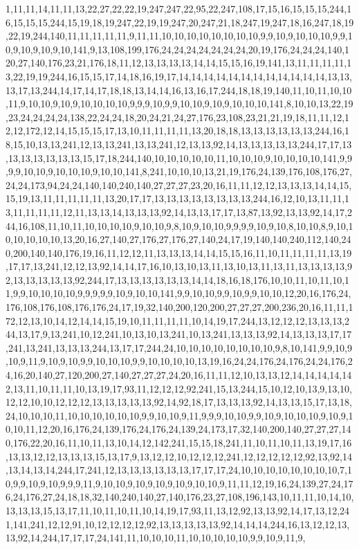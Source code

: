 1,11,11,14,11,11,13,22,27,22,22,19,247,247,22,95,22,247,108,17,15,16,15,15,15,244,16,15,15,15,244,15,19,18,19,247,22,19,19,247,20,247,21,18,247,19,247,18,16,247,18,19,22,19,244,140,11,11,11,11,11,9,11,11,10,10,10,10,10,10,10,10,9,9,10,9,10,10,10,9,9,10,9,10,9,10,9,10,141,9,13,108,199,176,24,24,24,24,24,24,24,20,19,176,24,24,24,140,120,27,140,176,23,21,176,18,11,12,13,13,13,13,14,14,15,15,16,19,141,13,11,11,11,11,13,22,19,19,244,16,15,15,17,14,18,16,19,17,14,14,14,14,14,14,14,14,14,14,14,14,13,13,13,17,13,244,14,17,14,17,18,18,13,14,14,16,13,16,17,244,18,18,19,140,11,10,11,10,10,11,9,10,10,9,10,9,10,10,10,10,9,9,9,10,9,9,10,10,9,10,9,10,10,10,141,8,10,10,13,22,19,23,24,24,24,24,138,22,24,24,18,20,24,21,24,27,176,23,108,23,21,21,19,18,11,11,12,12,12,172,12,14,15,15,15,17,13,10,11,11,11,11,13,20,18,18,13,13,13,13,13,13,244,16,18,15,10,13,13,241,12,13,13,241,13,13,241,12,13,13,92,14,13,13,13,13,13,244,17,17,13,13,13,13,13,13,13,15,17,18,244,140,10,10,10,10,10,11,10,10,10,9,10,10,10,10,141,9,9,9,9,10,10,9,10,10,10,9,10,10,141,8,241,10,10,10,13,21,19,176,24,139,176,108,176,27,24,24,173,94,24,24,140,140,240,140,27,27,27,23,20,16,11,11,12,12,13,13,13,14,14,15,15,19,13,11,11,11,11,11,13,20,17,17,13,13,13,13,13,13,13,13,244,16,12,10,13,11,11,13,11,11,11,11,12,11,13,13,14,13,13,13,92,14,13,13,17,17,13,87,13,92,13,13,92,14,17,244,16,108,11,10,11,10,10,10,10,9,10,10,9,8,10,9,10,10,9,9,9,9,10,9,10,8,10,10,8,9,10,10,10,10,10,10,13,20,16,27,140,27,176,27,176,27,140,24,17,19,140,140,240,112,140,240,200,140,140,176,19,16,11,12,12,11,13,13,13,14,14,15,15,16,11,10,11,11,11,11,13,19,17,17,13,241,12,12,13,92,14,14,17,16,10,13,10,13,11,13,10,13,11,13,11,13,13,13,13,92,13,13,13,13,13,92,244,17,13,13,13,13,13,13,14,14,18,16,18,176,10,10,11,10,11,10,11,9,9,10,10,10,10,9,9,9,9,9,10,9,10,10,141,9,9,10,10,9,9,10,9,9,10,10,12,20,16,176,24,176,108,176,108,176,176,24,17,19,32,140,200,120,200,27,27,27,200,236,20,16,11,11,172,12,13,10,14,12,14,14,15,19,10,11,11,11,11,10,14,19,17,244,13,12,12,12,13,13,13,244,13,17,9,13,241,10,12,241,10,13,10,13,241,10,13,241,13,13,13,92,14,13,13,13,17,17,241,13,241,13,13,13,244,13,17,17,244,24,10,10,10,10,10,10,10,10,9,8,10,141,9,9,10,9,10,9,11,9,10,9,10,9,9,10,10,10,9,9,10,10,10,10,13,19,16,24,24,176,24,176,24,24,176,24,16,20,140,27,120,200,27,140,27,27,27,24,20,16,11,11,12,10,13,13,12,14,14,14,14,142,13,11,10,11,11,10,13,19,17,93,11,12,12,12,92,241,15,13,244,15,10,12,10,13,9,13,10,12,12,10,10,12,12,12,13,13,13,13,13,92,14,92,18,17,13,13,13,92,14,13,13,15,17,13,18,24,10,10,10,11,10,10,10,10,10,10,9,9,10,10,9,11,9,9,9,10,10,9,9,10,9,10,10,10,9,10,9,10,10,11,12,20,16,176,24,139,176,24,176,24,139,24,173,17,32,140,200,140,27,27,27,140,176,22,20,16,11,10,11,13,10,14,12,142,241,15,15,18,241,11,10,11,10,11,13,19,17,16,13,13,12,12,13,13,13,15,13,17,9,13,12,12,10,12,12,12,241,12,12,12,12,12,92,13,92,14,13,14,13,14,244,17,241,12,13,13,13,13,13,13,17,17,17,24,10,10,10,10,10,10,10,10,7,10,9,9,10,9,10,9,9,9,11,9,10,10,9,10,9,10,9,10,9,10,10,9,11,11,12,19,16,24,139,27,24,176,24,176,27,24,18,18,32,140,240,140,27,140,176,23,27,108,196,143,10,11,11,10,14,10,13,13,13,15,13,17,11,10,11,10,11,10,14,19,17,93,11,13,12,92,13,13,92,14,17,13,12,241,141,241,12,12,91,10,12,12,12,12,92,13,13,13,13,13,92,14,14,14,244,16,13,12,12,13,13,92,14,244,17,17,17,24,141,11,10,10,10,11,10,10,10,10,10,9,9,10,9,11,9,